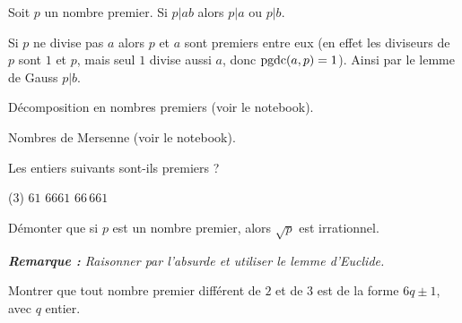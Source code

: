 \bigskip

\begin{proposition}\label{prop:lemme_euclide}
Soit $p$ un nombre premier.
Si $p | ab$ alors $p|a$ ou $p | b$.
\end{proposition}

\begin{demonstration}
Si $p$ ne divise pas $a$ alors $p$ et $a$ sont premiers entre eux
(en effet les diviseurs de $p$ sont $1$ et $p$, mais seul $1$ divise aussi $a$, donc $\textrm{pgdc}(a,p)=1$).
Ainsi par le lemme de Gauss $p | b$.
\end{demonstration}

\bigskip


\begin{exstheorie}
%
%
%
%
%
\exordi Décomposition en nombres premiers  (voir le notebook).

\eexo

\exordi Nombres de Mersenne  (voir le notebook).

\eexo

\exo
Les entiers suivants sont-ils premiers ?
\begin{tasks}[label=\alph*),item-indent=6mm,column-sep=0mm ,after-item-skip=3mm,label-offset=2mm,label-align=right](3)
	\task $61$
	\task $6661$
	\task $66\,661$
\end{tasks}


\eexo

\exo
Démonter que si $p$ est un nombre premier, alors $\sqrt{p}$ est irrationnel.

\textit{\small\textbf{Remarque :}
Raisonner par l'absurde et utiliser le lemme d'Euclide.}

\eexo

\exo

Montrer que tout nombre premier différent de $2$ et de $3$ est de la forme $6q \pm 1$, avec $q$ entier.%


\end{exstheorie}
